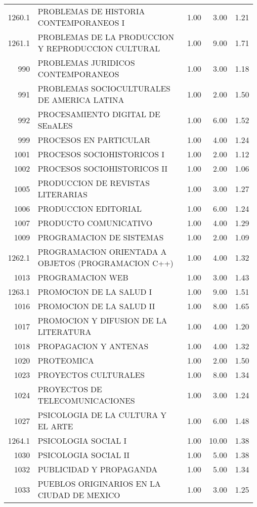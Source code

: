 \documentclass[12pt]{article}
\begin{document}
\begin{table}[ht]
\begin{tabular}{rlrrr}
  1260.1 & PROBLEMAS DE HISTORIA CONTEMPORANEOS I & 1.00 & 3.00 & 1.21 \\ 
  1261.1 & PROBLEMAS DE LA PRODUCCION Y REPRODUCCION CULTURAL & 1.00 & 9.00 & 1.71 \\ 
  990 & PROBLEMAS JURIDICOS CONTEMPORANEOS & 1.00 & 3.00 & 1.18 \\ 
  991 & PROBLEMAS SOCIOCULTURALES DE AMERICA LATINA & 1.00 & 2.00 & 1.50 \\ 
  992 & PROCESAMIENTO DIGITAL DE SEnALES & 1.00 & 6.00 & 1.52 \\ 
  999 & PROCESOS EN PARTICULAR & 1.00 & 4.00 & 1.24 \\ 
  1001 & PROCESOS SOCIOHISTORICOS I & 1.00 & 2.00 & 1.12 \\ 
  1002 & PROCESOS SOCIOHISTORICOS II & 1.00 & 2.00 & 1.06 \\ 
  1005 & PRODUCCION DE REVISTAS LITERARIAS & 1.00 & 3.00 & 1.27 \\ 
  1006 & PRODUCCION EDITORIAL & 1.00 & 6.00 & 1.24 \\ 
  1007 & PRODUCTO COMUNICATIVO & 1.00 & 4.00 & 1.29 \\ 
  1009 & PROGRAMACION DE SISTEMAS & 1.00 & 2.00 & 1.09 \\ 
  1262.1 & PROGRAMACION ORIENTADA A OBJETOS (PROGRAMACION C++) & 1.00 & 4.00 & 1.32 \\ 
  1013 & PROGRAMACION WEB & 1.00 & 3.00 & 1.43 \\ 
  1263.1 & PROMOCION DE LA SALUD I & 1.00 & 9.00 & 1.51 \\ 
  1016 & PROMOCION DE LA SALUD II & 1.00 & 8.00 & 1.65 \\ 
  1017 & PROMOCION Y DIFUSION DE LA LITERATURA & 1.00 & 4.00 & 1.20 \\ 
  1018 & PROPAGACION Y ANTENAS & 1.00 & 4.00 & 1.32 \\ 
  1020 & PROTEOMICA & 1.00 & 2.00 & 1.50 \\ 
  1023 & PROYECTOS CULTURALES & 1.00 & 8.00 & 1.34 \\ 
  1024 & PROYECTOS DE TELECOMUNICACIONES & 1.00 & 3.00 & 1.24 \\ 
  1027 & PSICOLOGIA DE LA CULTURA Y EL ARTE & 1.00 & 6.00 & 1.48 \\ 
  1264.1 & PSICOLOGIA SOCIAL I & 1.00 & 10.00 & 1.38 \\ 
  1030 & PSICOLOGIA SOCIAL II & 1.00 & 5.00 & 1.38 \\ 
  1032 & PUBLICIDAD Y PROPAGANDA & 1.00 & 5.00 & 1.34 \\ 
  1033 & PUEBLOS ORIGINARIOS EN LA CIUDAD DE MEXICO & 1.00 & 3.00 & 1.25 \\ 

\end{tabular}
\end{table}
\end{document}
